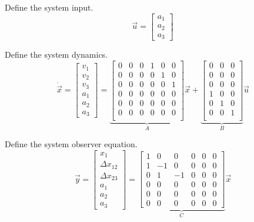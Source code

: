 \documentclass[12pt,onecolumn,reqno]{amsart}
\begin{document}
Define the system input.
\begin{equation}
  \vec{u} = 
  \begin{bmatrix}
    a_{1} \\
    a_{2} \\
    a_{3}
  \end{bmatrix}
\end{equation}

Define the system dynamics.
\begin{equation}
  \dot{\vec{x}}
  =
  \begin{bmatrix}
    v_{1} \\
    v_{2} \\
    v_{3} \\
    a_{1} \\
    a_{2} \\
    a_{3}
  \end{bmatrix}
  =
  \underbrace{
  \begin{bmatrix}
    0 & 0 & 0 & 1 & 0 & 0  \\
    0 & 0 & 0 & 0 & 1 & 0  \\
    0 & 0 & 0 & 0 & 0 & 1  \\
    0 & 0 & 0 & 0 & 0 & 0  \\
    0 & 0 & 0 & 0 & 0 & 0  \\
    0 & 0 & 0 & 0 & 0 & 0  \\
  \end{bmatrix}
  }_{A}
  \vec{x}
  +
  \underbrace{
  \begin{bmatrix}
    0 & 0 & 0 \\
    0 & 0 & 0 \\
    0 & 0 & 0 \\
    1 & 0 & 0 \\
    0 & 1 & 0 \\
    0 & 0 & 1 \\
  \end{bmatrix}
  }_{B}
  \vec{u}
\end{equation}

Define the system observer equation.
\begin{equation}
  \vec{y} = 
  \begin{bmatrix}
    x_{1}             \\
    \Delta x_{12}     \\
    \Delta x_{23}     \\
    a_{1}             \\
    a_{2}             \\
    a_{3}             
  \end{bmatrix}
  =
  \underbrace{
  \begin{bmatrix}
    1 & 0 & 0 & 0 & 0 & 0   \\
    1 & -1 & 0 & 0 & 0 & 0  \\
    0 & 1 & -1 & 0 & 0 & 0  \\
    0 & 0 & 0 & 0 & 0 & 0   \\
    0 & 0 & 0 & 0 & 0 & 0   \\
    0 & 0 & 0 & 0 & 0 & 0  
  \end{bmatrix}
  }_{C}
  \vec{x}
\end{equation}
\end{document}
